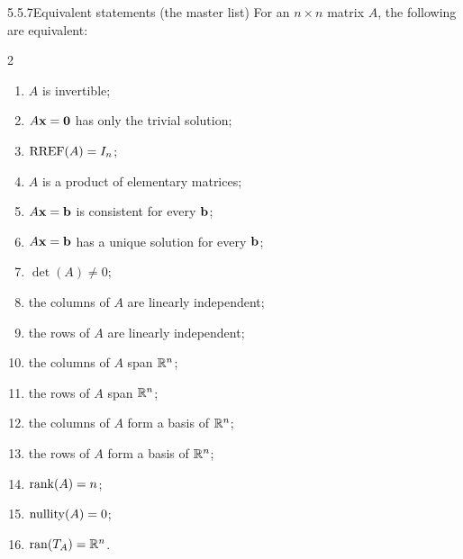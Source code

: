 \begin{thms}{5.5.7}{Equivalent statements (the master list)}
For an $n\times n$ matrix $A$, the following are equivalent:
\setlength{\columnsep}{2.4em}
\begin{multicols}{2}
\begin{enumerate}[label=\textup{(\alph*)},leftmargin=1.8em,itemsep=2pt]
\item $A$ is invertible;
\item $A\mathbf{x}=\mathbf{0}$ has only the trivial solution;
\item $\operatorname{RREF}(A)=I_n$;
\item $A$ is a product of elementary matrices;
\item $A\mathbf{x}=\mathbf{b}$ is consistent for every $\mathbf{b}$;
\item $A\mathbf{x}=\mathbf{b}$ has a unique solution for every $\mathbf{b}$;
\item $\det(A)\neq0$;
\item the columns of $A$ are linearly independent;
\columnbreak
\item the rows of $A$ are linearly independent;
\item the columns of $A$ span $\mathbb{R}^n$;
\item the rows of $A$ span $\mathbb{R}^n$;
\item the columns of $A$ form a basis of $\mathbb{R}^n$;
\item the rows of $A$ form a basis of $\mathbb{R}^n$;
\item $\operatorname{rank}(A)=n$;
\item $\operatorname{nullity}(A)=0$;
\item $\operatorname{ran}(T_A)=\mathbb{R}^n$.
\end{enumerate}
\end{multicols}
\end{thms}

